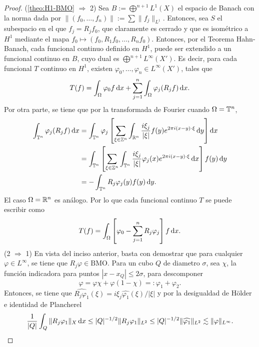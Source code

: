 \begin{proof}
	(\cref{theo:H1-BMO} $\Rightarrow$ 2) Sea $B:=\bigoplus^{n+1} L^1(X)$ el espacio de Banach con la norma dada por $\|(f_0,\ldots,f_n)\| := \sum\|f_j\|_{L^1}$. Entonces, sea $S$ el subespacio en el que $f_j = R_jf_0$, que claramente es cerrado y que es isométrico a $H^1$ mediante el mapa $f_0\mapsto(f_0, R_1f_0, \ldots, R_nf_0 )$. Entonces, por el Teorema Hahn-Banach, cada funcional continuo definido en $H^1$, puede ser extendido a un funcional continuo en $B$, cuyo dual es $\bigoplus^{n+1}L^\infty(X')$. Es decir, para cada funcional $T$ continuo en $H^1$, existen $\varphi_0,\ldots,\varphi_n\in L^\infty(X')$, tales que
	\begin{equation*}
		T(f)  = \int_{\Omega} {\varphi_0 f}\mathop{}\!\mathrm{d} x + \sum_{j=1}^n \int_{\Omega} \varphi_j(R_jf) \mathop{}\!\mathrm{d} x.
	\end{equation*}
	Por otra parte, se tiene que por la transformada de Fourier cuando $\Omega=\mathbb{T}^n$,
	\begin{align*}
		\int_{\mathbb{T}^n}\varphi_j(R_jf)\mathop{}\!\mathrm{d} x & = \int_{\mathbb{T}^n}\varphi_j \left[\sum_{\xi\in\mathbb{Z}^n}\int_{\mathbb{R}^n}  \frac{i\xi_j}{|\xi|} f(y)e^{2\pi i (x-y)\cdot\xi} \mathop{}\!\mathrm{d} y 
		\right]  \mathop{}\!\mathrm{d} x \\
		& = \int_{\mathbb{T}^n}  \left[\sum_{\xi\in\mathbb{Z}^n}\int_{\mathbb{T}^n}  \frac{i\xi_j}{|\xi|}  \varphi_j(x)e^{2\pi i (x-y)\cdot\xi} \mathop{}\!\mathrm{d} x 
		\right] f(y) \mathop{}\!\mathrm{d} y \\
		& = - \int_{\mathbb{T}^n}  R_j\varphi_j(y)f(y) \mathop{}\!\mathrm{d} y.
	\end{align*}
	El caso $\Omega=\mathbb{R}^n$ es análogo. Por lo que cada funcional continuo $T$ se puede escribir como 
	\begin{equation*}
		T(f) = \int_{\Omega}  \left[ \varphi_0 - \sum_{j=1}^n R_j\varphi_j
		\right] f \mathop{}\!\mathrm{d} x.
	\end{equation*}
	(2 $\Rightarrow$ 1) En vista del inciso anterior, basta con demostrar que para cualquier $\varphi\in L^\infty$, se tiene que $R_j\varphi \in \mathrm{BMO}$. Para un cubo $Q$ de diametro $\sigma$, sea $\chi$, la función indicadora para puntos $|x-x_Q|\leq2\sigma$, para descomponer 
	\begin{equation*}
		\varphi = \varphi\chi + \varphi(1-\chi) =: \varphi_1 + \varphi_2. 
	\end{equation*}
	Entonces, se tiene que $\widehat{R_j\varphi_1}(\xi) = i\xi_j\widehat{\varphi_1}(\xi)/|\xi|$ y por la desigualdad de Hölder e identidad de Plancherel
	\begin{equation}\label{eq:Rj-L-infty}
		\frac{1}{|Q|}\int_Q \|R_j\varphi_1\|_X\diff x \leq |Q|^{-1/2} \|R_j\varphi_1\|_{L^2} \leq|Q|^{-1/2} \|\widehat{\varphi_1}\|_{L^2}  \lesssim \|\varphi\|_{L^\infty}.

\end{equation}
\end{proof}
